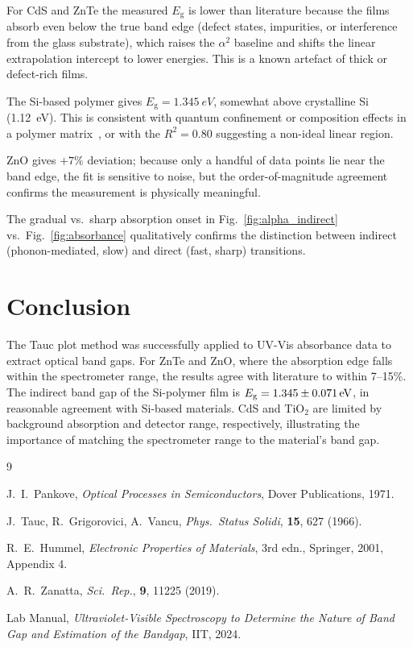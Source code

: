 \documentclass[12pt,a4paper]{article}
\newcommand{\Eg}{E_{\mathrm{g}}}
\begin{document}
For CdS and ZnTe the measured $\Eg$ is lower than literature because the films absorb
even below the true band edge (defect states, impurities, or interference from the glass
substrate), which raises the $\alpha^2$ baseline and shifts the linear extrapolation
intercept to lower energies.  This is a known artefact of thick or defect-rich films.

The Si-based polymer gives $\Eg = \SI{1.345}{eV}$, somewhat above crystalline Si
(\SI{1.12}{eV}).  This is consistent with quantum confinement or composition effects in a
polymer matrix~\cite{labmanual}, or with the $R^2 = 0.80$ suggesting a non-ideal
linear region.

ZnO gives $+7\%$ deviation; because only a handful of data points lie near the band edge,
the fit is sensitive to noise, but the order-of-magnitude agreement confirms the measurement
is physically meaningful.

The gradual vs.\ sharp absorption onset in Fig.~\ref{fig:alpha_indirect} vs.\
Fig.~\ref{fig:absorbance} qualitatively confirms the distinction between indirect
(phonon-mediated, slow) and direct (fast, sharp) transitions.

\section{Conclusion}

The Tauc plot method was successfully applied to UV-Vis absorbance data to extract optical
band gaps.  For ZnTe and ZnO, where the absorption edge falls within the spectrometer
range, the results agree with literature to within 7--15\%.  The indirect band gap of the
Si-polymer film is $\Eg = \SI[parse-numbers=false]{1.345 \pm 0.071}{eV}$, in reasonable
agreement with Si-based materials.  CdS and TiO$_2$ are limited by background absorption
and detector range, respectively, illustrating the importance of matching the spectrometer
range to the material's band gap.

\begin{thebibliography}{9}

  J.~I.~Pankove,
  \textit{Optical Processes in Semiconductors},
  Dover Publications, 1971.

  J.~Tauc, R.~Grigorovici, A.~Vancu,
  \textit{Phys.\ Status Solidi}, \textbf{15}, 627 (1966).

  R.~E.~Hummel,
  \textit{Electronic Properties of Materials}, 3rd edn.,
  Springer, 2001, Appendix 4.

  A.~R.~Zanatta,
  \textit{Sci.\ Rep.}, \textbf{9}, 11225 (2019).

  Lab Manual,
  \textit{Ultraviolet-Visible Spectroscopy to Determine the Nature of Band Gap
  and Estimation of the Bandgap},
  IIT, 2024.

\end{thebibliography}
\end{document}
